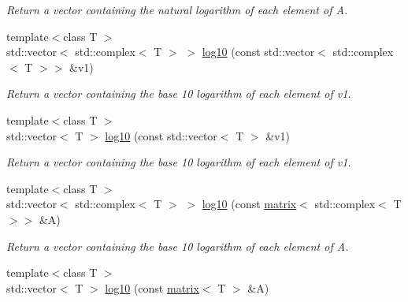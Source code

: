 \begin{DoxyCompactItemize}
\begin{DoxyCompactList}\small\item\em Return a vector containing the natural logarithm of each element of A. \end{DoxyCompactList}\item 
\hypertarget{namespacekeycpp_afb93c1aed2037f957fa113994d7239ee}{{\footnotesize template$<$class T $>$ }\\std\-::vector$<$ std\-::complex$<$ T $>$ $>$ \hyperlink{namespacekeycpp_afb93c1aed2037f957fa113994d7239ee}{log10} (const std\-::vector$<$ std\-::complex$<$ T $>$$>$ \&v1)}\label{namespacekeycpp_afb93c1aed2037f957fa113994d7239ee}

\begin{DoxyCompactList}\small\item\em Return a vector containing the base 10 logarithm of each element of v1. \end{DoxyCompactList}\item 
\hypertarget{namespacekeycpp_a3042ac961c7bffb3c315f41f175c5760}{{\footnotesize template$<$class T $>$ }\\std\-::vector$<$ T $>$ \hyperlink{namespacekeycpp_a3042ac961c7bffb3c315f41f175c5760}{log10} (const std\-::vector$<$ T $>$ \&v1)}\label{namespacekeycpp_a3042ac961c7bffb3c315f41f175c5760}

\begin{DoxyCompactList}\small\item\em Return a vector containing the base 10 logarithm of each element of v1. \end{DoxyCompactList}\item 
\hypertarget{namespacekeycpp_a3ea3b5f6f548e122d29e4571e15307fd}{{\footnotesize template$<$class T $>$ }\\std\-::vector$<$ std\-::complex$<$ T $>$ $>$ \hyperlink{namespacekeycpp_a3ea3b5f6f548e122d29e4571e15307fd}{log10} (const \hyperlink{classkeycpp_1_1matrix}{matrix}$<$ std\-::complex$<$ T $>$$>$ \&A)}\label{namespacekeycpp_a3ea3b5f6f548e122d29e4571e15307fd}

\begin{DoxyCompactList}\small\item\em Return a vector containing the base 10 logarithm of each element of A. \end{DoxyCompactList}\item 
\hypertarget{namespacekeycpp_a1b6529b56bdc13937f058879d0f5881d}{{\footnotesize template$<$class T $>$ }\\std\-::vector$<$ T $>$ \hyperlink{namespacekeycpp_a1b6529b56bdc13937f058879d0f5881d}{log10} (const \hyperlink{classkeycpp_1_1matrix}{matrix}$<$ T $>$ \&A)}\label{namespacekeycpp_a1b6529b56bdc13937f058879d0f5881d}


\end{DoxyCompactItemize}
